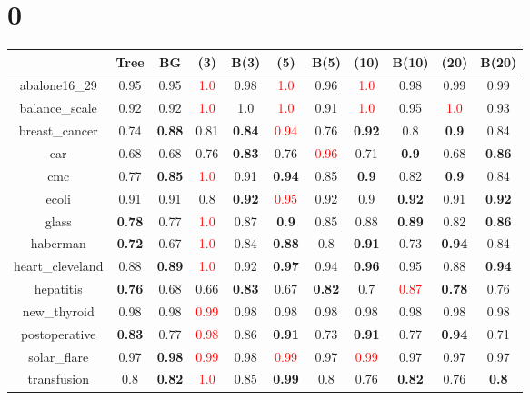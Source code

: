 \documentclass{article}%
\begin{document}
%
\normalsize%
\section*{0}%
\begin{tabular}{c|cccccccccc}%
\hline%
&Tree&BG&(3)&B(3)&(5)&B(5)&(10)&B(10)&(20)&B(20)\\%
\hline%
abalone16\_29&0.95&0.95&\textcolor{red}{ 
1.0
}&0.98&\textcolor{red}{ 
1.0
}&0.96&\textcolor{red}{ 
1.0
}&0.98&0.99&0.99\\%
\hline%
balance\_scale&0.92&0.92&\textcolor{red}{ 
1.0
}&1.0&\textcolor{red}{ 
1.0
}&0.91&\textcolor{red}{ 
1.0
}&0.95&\textcolor{red}{ 
1.0
}&0.93\\%
\hline%
breast\_cancer&0.74&\textbf{0.88}&0.81&\textbf{0.84}&\textcolor{red}{ 
0.94
}&0.76&\textbf{0.92}&0.8&\textbf{0.9}&0.84\\%
\hline%
car&0.68&0.68&0.76&\textbf{0.83}&0.76&\textcolor{red}{ 
0.96
}&0.71&\textbf{0.9}&0.68&\textbf{0.86}\\%
\hline%
cmc&0.77&\textbf{0.85}&\textcolor{red}{ 
1.0
}&0.91&\textbf{0.94}&0.85&\textbf{0.9}&0.82&\textbf{0.9}&0.84\\%
\hline%
ecoli&0.91&0.91&0.8&\textbf{0.92}&\textcolor{red}{ 
0.95
}&0.92&0.9&\textbf{0.92}&0.91&\textbf{0.92}\\%
\hline%
glass&\textbf{0.78}&0.77&\textcolor{red}{ 
1.0
}&0.87&\textbf{0.9}&0.85&0.88&\textbf{0.89}&0.82&\textbf{0.86}\\%
\hline%
haberman&\textbf{0.72}&0.67&\textcolor{red}{ 
1.0
}&0.84&\textbf{0.88}&0.8&\textbf{0.91}&0.73&\textbf{0.94}&0.84\\%
\hline%
heart\_cleveland&0.88&\textbf{0.89}&\textcolor{red}{ 
1.0
}&0.92&\textbf{0.97}&0.94&\textbf{0.96}&0.95&0.88&\textbf{0.94}\\%
\hline%
hepatitis&\textbf{0.76}&0.68&0.66&\textbf{0.83}&0.67&\textbf{0.82}&0.7&\textcolor{red}{ 
0.87
}&\textbf{0.78}&0.76\\%
\hline%
new\_thyroid&0.98&0.98&\textcolor{red}{ 
0.99
}&0.98&0.98&0.98&0.98&0.98&0.98&0.98\\%
\hline%
postoperative&\textbf{0.83}&0.77&\textcolor{red}{ 
0.98
}&0.86&\textbf{0.91}&0.73&\textbf{0.91}&0.77&\textbf{0.94}&0.71\\%
\hline%
solar\_flare&0.97&\textbf{0.98}&\textcolor{red}{ 
0.99
}&0.98&\textcolor{red}{ 
0.99
}&0.97&\textcolor{red}{ 
0.99
}&0.97&0.97&0.97\\%
\hline%
transfusion&0.8&\textbf{0.82}&\textcolor{red}{ 
1.0
}&0.85&\textbf{0.99}&0.8&0.76&\textbf{0.82}&0.76&\textbf{0.8}\\%

\end{tabular}
\end{document}
